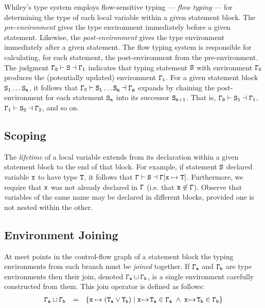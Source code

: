 Whiley's type system employs flow-sensitive typing --- {\em flow
  typing} --- for determining the type of each local variable within a
given statement block.  The {\em pre-environment} gives the type
environment immediately before a given statement.  Likewise, the {\em
  post-environment} gives the type environment immediately after a
given statement.  The flow typing system is responsible for
calculating, for each statement, the post-environment from the
pre-environment.  The judgment ${\tt\Gamma_0\vdash S\dashv \Gamma_1}$
indicates that typing statement ${\tt S}$ with environment
${\tt\Gamma_0}$ produces the (potentially updated) environment
${\tt\Gamma_1}$.  For a given statement block ${\tt S_1\ldots S_n}$, it
follows that ${\tt\Gamma_0\vdash S_1\ldots S_n\dashv \Gamma_n}$ expands by
chaining the post-environment for each statement ${\tt S_n}$ into its
successor ${\tt S_{n+1}}$.  That is,
${\tt\Gamma_0\vdash S_1\dashv \Gamma_1}$,
${\tt\Gamma_1\vdash S_2\dashv \Gamma_2}$, and so on.


\subsection{Scoping}

The {\em lifetime} of a local variable extends from its declaration
within a given statement block to the end of that block.  For example,
if statement ${\tt S}$ declared variable ${\tt x}$ to have type
${\tt T}$, it follows that
${\tt \Gamma\vdash S\dashv \Gamma[x\mapsto T]}$.  Furthermore, we require
that ${\tt x}$ was not already declared in ${\tt\Gamma}$ (i.e. that
${\tt x\not\in\Gamma}$).  Observe that variables of the same name may
be declared in different blocks, provided one is not nested within the
other.

\subsection{Environment Joining}

At meet points in the control-flow graph of a statement block the
typing environments from each branch must be {\em joined} together. If
${\tt\Gamma_a}$ and ${\tt\Gamma_b}$ are type environments then their
join, denoted ${\tt\Gamma_a\sqcup\Gamma_b}$, is a single environment
carefully constructed from them.  This join operator is defined as
follows:
\begin{displaymath}
\begin{array}{rcl}
{\tt \Gamma_a\sqcup\Gamma_b} & = & {\tt \{ x\mapsto(T_a\lor T_b)\;|\;x\!\mapsto\!T_a\in\Gamma_a\;\land\;x\!\mapsto\!T_b\in\Gamma_b\}}\\
\end{array}
\end{displaymath}

